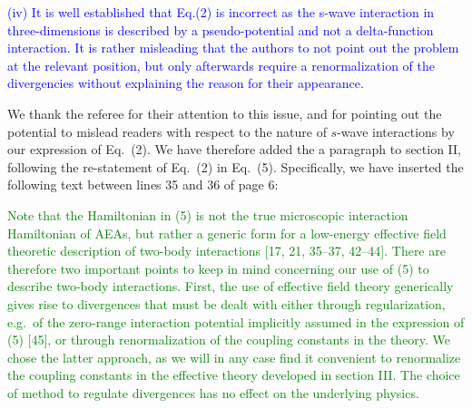 \documentclass[preprint]{revtex4-1}
\newcommand{\1}{\mathds{1}}
\newcommand{\blue}[1]{\textcolor{blue}{#1}}
\newcommand{\green}[1]{\textcolor{green}{#1}}
\begin{document}
\begin{enumerate}
  \blue{(iv) It is well established that Eq.(2) is incorrect as the
    s-wave interaction in three-dimensions is described by a
    pseudo-potential and not a delta-function interaction. It is
    rather misleading that the authors to not point out the problem at
    the relevant position, but only afterwards require a
    renormalization of the divergencies without explaining the reason
    for their appearance.}

  \label{pt:pseudo-potential}

  We thank the referee for their attention to this issue, and for
  pointing out the potential to mislead readers with respect to the
  nature of $s$-wave interactions by our expression of Eq.~(2).  We
  have therefore added the a paragraph to section II, following the
  re-statement of Eq.~(2) in Eq.~(5).  Specifically, we have inserted
  the following text between lines 35 and 36 of page 6:

  \green{Note that the Hamiltonian in (5) is not the true microscopic
    interaction Hamiltonian of AEAs, but rather a generic form for a
    low-energy effective field theoretic description of two-body
    interactions [17, 21, 35--37, 42--44].  There are therefore two
    important points to keep in mind concerning our use of (5) to
    describe two-body interactions.  First, the use of effective field
    theory generically gives rise to divergences that must be dealt
    with either through regularization, e.g.~of the zero-range
    interaction potential implicitly assumed in the expression of (5)
    [45], or through renormalization of the coupling constants in the
    theory.  We chose the latter approach, as we will in any case find
    it convenient to renormalize the coupling constants in the
    effective theory developed in section III.  The choice of method
    to regulate divergences has no effect on the underlying physics.}


\end{enumerate}
\end{document}
